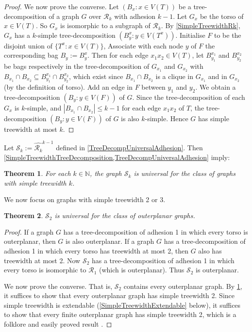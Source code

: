 \documentclass[a4paper,11pt]{article}
\theoremstyle{plain}
\newtheorem{thm}{Theorem}[section]
\theoremstyle{definition}
\renewcommand{\leq}{\leqslant}
\newcommand{\RR}{\mathcal{R}}
\newcommand{\NN}{\mathbb{N}}
\renewcommand{\SS}{\mathcal{S}}
\begin{document}
\begin{proof}
We now prove the converse. Let $(B_x:x\in V(T))$ be a tree-decomposition of a graph $G$ over $\RR_k$ with adhesion $k-1$. Let $G_x$ be the torso of $x\in V(T)$. So $G_x$ is isomorphic to a subgraph of $\RR_k$. By \cref{SimpleTreewidthRk}, $G_x$ has a $k$-simple tree-decomposition $(B^x_y: y \in V(T^x))$. Initialise $F$ to be the disjoint union of $\{T^x:x\in V(T)\}$, Associate with each node $y$ of $F$ the corresponding bag $B_y:= B^x_y$.  
Then for each edge $x_1x_2\in V(T)$, let $B^{x_1}_{y_1}$ and $B^{x_2}_{y_2}$ 
be bags respectively in the tree-decomposition of $G_{x_1}$ and $G_{x_2}$ with $B_{x_1}\cap B_{x_2} \subseteq B^{x_1}_{y_1} \cap B^{x_2}_{y_2}$, which exist since $B_{x_1}\cap B_{x_2}$ is a clique in $G_{x_1}$ and in $G_{x_2}$ (by the definition of torso). Add an edge in $F$ between $y_1$ and $y_2$. We obtain a tree-decomposition $(B_y:y\in V(F))$ of $G$. Since the tree-decomposition of each $G_x$ is $k$-simple, and $|B_{x_1}\cap B_{x_2}|\leq k-1$ for each edge $x_1x_2$ of $T$, the tree-decomposition  $(B_y:y\in V(F))$ of $G$ is also $k$-simple. Hence $G$ has simple treewidth at most $k$. 
\end{proof}

Let $\SS_k:= \widehat{\RR_k}^{k-1}$ defined in \cref{TreeDecompUniversalAdhesion}. Then  \cref{SimpleTreewidthTreeDecomposition,TreeDecompUniversalAdhesion} imply:

\begin{thm}
\label{SimpleTreewidthUniversal}
For each $k\in\NN$, the graph $\SS_k$ is universal for the class of graphs with simple treewidth $k$. 
\end{thm}

We now focus on graphs with simple treewidth 2 or 3. 

\begin{thm}
$\SS_2$ is universal for the class of outerplanar graphs.
\end{thm}

\begin{proof}
If a graph $G$ has a tree-decomposition of adhesion 1 in which every torso is outerplanar, then $G$ is also outerplanar. If a graph $G$ has a tree-decomposition of adhesion 1 in which every torso has treewidth at most 2, then $G$ also has treewidth at most 2. Now $\SS_2$ has a tree-decomposition of adhesion 1 in which every torso is isomorphic to $\RR_1$ (which is outerplanar). Thus $\SS_2$ is outerplanar. 

We now prove the converse. That is, $\SS_2$ contains every outerplanar graph. By \cref{SimpleTreewidthUniversal}, it suffices to show that every outerplanar graph has simple treewidth 2. Since simple treewidth is extendable (\cref{SimpleTreewidthExtendable} below), it suffices to show that every finite outerplanar graph has simple treewidth 2, which is a folklore and easily proved result \citep{MJP06,Wulf16,KU12}.
\end{proof}
\end{document}
